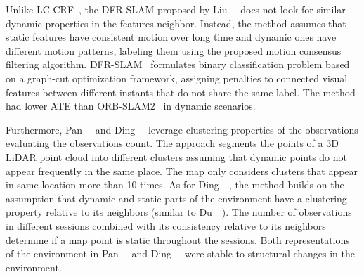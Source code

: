 Unlike \gls{LC-CRF}~\cite{du-et-al:2022:3028218}, the \gls{DFR-SLAM} proposed by Liu~\etal~\cite{liu-et-al:2022:8} does not look for similar dynamic properties in the features neighbor. Instead, the method \cite{liu-et-al:2022:8} assumes that static features have consistent motion over long time and dynamic ones have different motion patterns, labeling them using the proposed motion consensus filtering algorithm. \gls{DFR-SLAM}~\cite{liu-et-al:2022:8} formulates binary classification problem based on a graph-cut optimization framework, assigning penalties to connected visual features between different instants that do not share the same label. The method \cite{liu-et-al:2022:8} had lower \gls{ATE} than ORB-SLAM2~\cite{discussion:orb-slam2} in dynamic scenarios.

Furthermore, Pan~\etal~\cite{pan-et-al:2019:s19194252} and Ding~\etal~\cite{ding-et-al:2020:2942760} leverage clustering properties of the observations evaluating the observations count.
The approach \cite{pan-et-al:2019:s19194252} segments the points of a 3D \gls{LiDAR} point cloud into different clusters assuming that dynamic points do not appear frequently in the same place. The map only considers clusters that appear in same location more than 10 times.
As for Ding~\etal~\cite{ding-et-al:2020:2942760}, the method builds on the assumption that dynamic and static parts of the environment have a clustering property relative to its neighbors (similar to Du~\etal~\cite{du-et-al:2022:3028218}). The number of observations in different sessions combined with its consistency relative to its neighbors determine if a map point is static throughout the sessions.
Both representations of the environment in Pan~\etal~\cite{pan-et-al:2019:s19194252} and Ding~\etal~\cite{ding-et-al:2020:2942760} were stable to structural changes in the environment.

